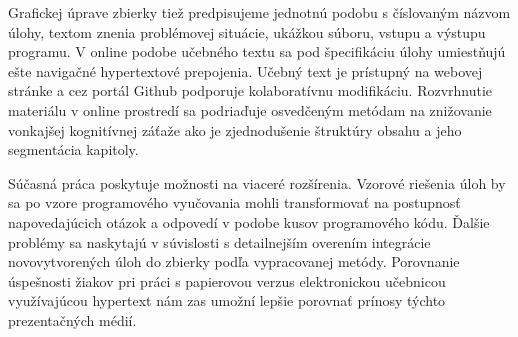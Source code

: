 Grafickej úprave zbierky tiež predpisujeme jednotnú podobu s číslovaným názvom úlohy, textom znenia problémovej situácie, ukážkou súboru, vstupu a výstupu programu. V online podobe učebného textu sa pod špecifikáciu úlohy umiestňujú ešte navigačné hypertextové prepojenia. Učebný text je prístupný na webovej stránke a cez portál Github podporuje kolaboratívnu modifikáciu. Rozvrhnutie materiálu v online prostredí sa podriaďuje osvedčeným metódam na znižovanie vonkajšej kognitívnej záťaže ako je zjednodušenie štruktúry obsahu a jeho segmentácia kapitoly.

Súčasná práca poskytuje možnosti na viaceré rozšírenia. Vzorové riešenia úloh by sa po vzore programového vyučovania mohli transformovať na postupnosť napovedajúcich otázok a odpovedí v podobe kusov programového kódu. Ďalšie problémy sa naskytajú v súvislosti s detailnejším overením integrácie novovytvorených úloh do zbierky podľa vypracovanej metódy. Porovnanie úspešnosti žiakov pri práci s papierovou verzus elektronickou učebnicou využívajúcou hypertext nám zas umožní lepšie porovnať prínosy týchto prezentačných médií.
